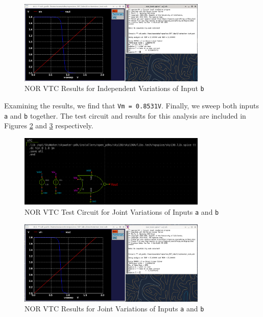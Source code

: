 \documentclass[fleqn]{article}
\begin{document}
	\begin{figure}[H]
		\centerline{\includegraphics[width=0.8\textwidth]{nor_vtc_sweep_vb.png}}
		\caption{NOR VTC Results for Independent Variations of Input \texttt{b}}
		\label{fig::nor_vtc_sweep_vb}
	\end{figure}
	
	Examining the results, we find that \texttt{Vm = 0.8531V}. Finally, we sweep both inputs \texttt{a} and \texttt{b} together. The test circuit and results for this analysis are included in Figures \ref{fig::nor_vtc_test_sweep_va_vb} and \ref{fig::nor_vtc_sweep_va_vb} respectively.
	
	\begin{figure}[H]
		\centerline{\includegraphics[width=0.8\textwidth]{nor_vtc_test_sweep_va_vb.png}}
		\caption{NOR VTC Test Circuit for Joint Variations of Inputs \texttt{a} and \texttt{b}}
		\label{fig::nor_vtc_test_sweep_va_vb}
	\end{figure}
	
	\begin{figure}[H]
		\centerline{\includegraphics[width=0.8\textwidth]{nor_vtc_sweep_va_vb.png}}
		\caption{NOR VTC Results for Joint Variations of Inputs \texttt{a} and \texttt{b}}
		\label{fig::nor_vtc_sweep_va_vb}
	\end{figure}
	
\end{document}
